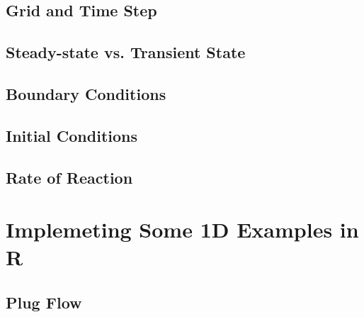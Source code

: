 \documentclass{tufte-handout}\usepackage[]{graphicx}\usepackage[]{xcolor}
\begin{document}
\subsection{Grid and Time Step}


\subsection{Steady-state vs. Transient State}

\subsection{Boundary Conditions}

\subsection{Initial Conditions}

\subsection{Rate of Reaction}



\section{Implemeting Some 1D Examples in R}

\subsection{Plug Flow}
\end{document}
